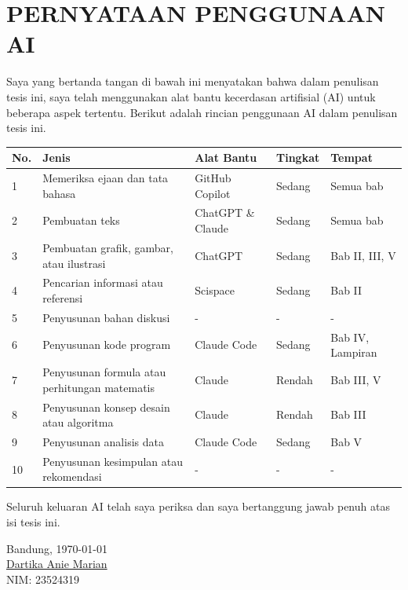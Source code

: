 \chapter*{PERNYATAAN PENGGUNAAN AI}
Saya yang bertanda tangan di bawah ini menyatakan bahwa dalam penulisan tesis ini, saya telah menggunakan alat bantu kecerdasan artifisial (AI) untuk beberapa aspek tertentu. Berikut adalah rincian penggunaan AI dalam penulisan tesis ini.

\begin{center}
\small
\renewcommand{\arraystretch}{1.2}
\begin{tabular}{|p{0.7cm}|p{4.2cm}|p{2.8cm}|p{2cm}|p{3cm}|}
\hline
\textbf{No.} & \textbf{Jenis} & \textbf{Alat Bantu} & \textbf{Tingkat} & \textbf{Tempat} \\
\hline
1 & Memeriksa ejaan dan tata bahasa & GitHub Copilot & Sedang & Semua bab \\
\hline
2 & Pembuatan teks & ChatGPT \& Claude & Sedang & Semua bab \\
\hline
3 & Pembuatan grafik, gambar, atau ilustrasi & ChatGPT & Sedang & Bab II, III, V \\
\hline
4 & Pencarian informasi atau referensi & Scispace & Sedang & Bab II \\
\hline
5 & Penyusunan bahan diskusi & - & - & -\\
\hline
6 & Penyusunan kode program & Claude Code & Sedang & Bab IV, Lampiran \\
\hline
7 & Penyusunan formula atau perhitungan matematis & Claude & Rendah & Bab III, V \\
\hline
8 & Penyusunan konsep desain atau algoritma & Claude & Rendah & Bab III \\
\hline
9 & Penyusunan analisis data & Claude Code & Sedang & Bab V \\
\hline
10 & Penyusunan kesimpulan atau rekomendasi & - & - & - \\
\hline
\end{tabular}
\end{center}

\vspace{0.5cm}
Seluruh keluaran AI telah saya periksa dan saya bertanggung jawab penuh atas isi tesis ini.

\vspace{0.5cm}
Bandung, \today\\[1.5cm]

\underline{Dartika Anie Marian} \\
NIM: 23524319